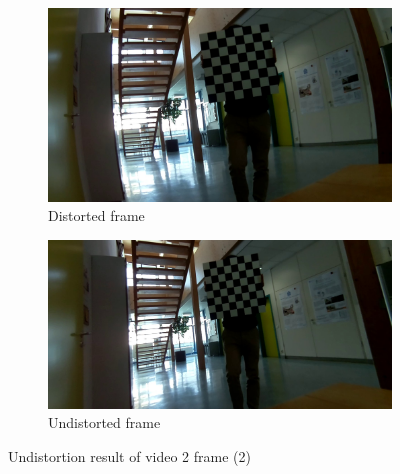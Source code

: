 \begin{figure}[h]
    \centering
    \begin{subfigure}[b]{0.48\textwidth}
        \centering
        \includegraphics[width=\textwidth]{figures/addl/img10_0.jpg}
        \caption{Distorted frame}
    \end{subfigure}
    \hfill
    \begin{subfigure}[b]{0.48\textwidth}
        \centering
        \includegraphics[width=\textwidth]{figures/addl/img10_5.jpg}
        \caption{Undistorted frame}
    \end{subfigure}
    \caption{Undistortion result of video 2 frame (2)}
    \label{fig:dist_2a2}
\end{figure}

